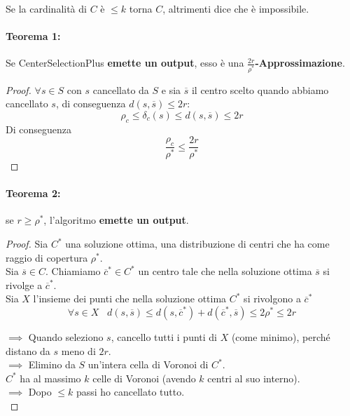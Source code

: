 Se la cardinalità di $C$ è $\leq k$ torna $C$, altrimenti dice che è impossibile.\\

\newpage

\paragraph{Teorema 1:} Se CenterSelectionPlus \textbf{emette un output}, esso è una \textbf{$\frac{2r}{\rho^\ast}$-Approssimazione}.

\begin{proof}
	$\forall s \in S$ con $s$ cancellato da $S$ e sia $\overline{s}$ il centro scelto quando abbiamo cancellato $s$, di conseguenza $d(s, \overline{s}) \leq 2r$:
	$$\rho_c \leq \delta_c (s) \leq d(s, \overline{s}) \leq 2r $$
	Di conseguenza
	$$ \frac{\rho_c}{\rho^\ast} \leq \frac{2r}{\rho^\ast}$$
\end{proof}

\paragraph{Teorema 2:} se $r \geq \rho^\ast$, l'algoritmo \textbf{emette un output}.\\

\begin{proof}
	Sia $C^\ast$ una soluzione ottima, una distribuzione di centri che ha come raggio di copertura $\rho^\ast$.  \\
	Sia $\overline{s} \in C$. Chiamiamo $\overline{c}^\ast \in C^\ast$ un centro tale che nella soluzione ottima $\overline{s}$ si rivolge a $\overline{c}^\ast$.\\
	Sia $X$ l'insieme dei punti che nella soluzione ottima $C^\ast$ si rivolgono a $\overline{c}^\ast$
	$$ \forall s \in X \;\;\; d(s, \overline{s}) \leq d(s, \overline{c}^\ast) + d(\overline{c}^\ast, \overline{s}) \leq 2 \rho^\ast \leq 2r $$
	
	$\implies$ Quando seleziono $s$, cancello tutti i punti di $X$ (come minimo), perché distano da $s$ meno di $2r$.\\
	$\implies$ Elimino da $S$ un'intera cella di Voronoi di $C^\ast$.\\
	
	$C^\ast$ ha al massimo $k$ celle di Voronoi (avendo $k$ centri al suo interno).\\
	$\implies$ Dopo $\leq k$ passi ho cancellato tutto.\\
\end{proof}

